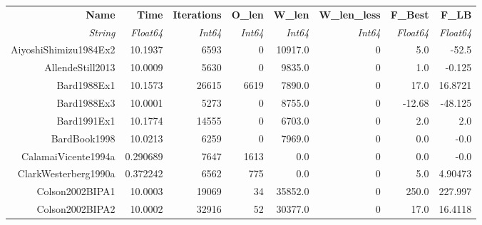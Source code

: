 \begin{tabular}{|r|r|r|r|r|r|r|r|}
  \hline
  \textbf{Name} & \textbf{Time} & \textbf{Iterations} & \textbf{O\_len} & \textbf{W\_len} & \textbf{W\_len\_less} & \textbf{F\_Best} & \textbf{F\_LB} \\
  \textit{String} & \textit{Float64} & \textit{Int64} & \textit{Int64} & \textit{Int64} & \textit{Int64} & \textit{Float64} & \textit{Float64} \\
  \hline
  AiyoshiShimizu1984Ex2 & 10.1937 & 6593 & 0 & 10917.0 & 0 & 5.0 & -52.5 \\
  AllendeStill2013 & 10.0009 & 5630 & 0 & 9835.0 & 0 & 1.0 & -0.125 \\
  Bard1988Ex1 & 10.1573 & 26615 & 6619 & 7890.0 & 0 & 17.0 & 16.8721 \\
  Bard1988Ex3 & 10.0001 & 5273 & 0 & 8755.0 & 0 & -12.68 & -48.125 \\
  Bard1991Ex1 & 10.1774 & 14555 & 0 & 6703.0 & 0 & 2.0 & 2.0 \\
  BardBook1998 & 10.0213 & 6259 & 0 & 7969.0 & 0 & 0.0 & -0.0 \\
  CalamaiVicente1994a & 0.290689 & 7647 & 1613 &   0.0 & 0 & 0.0 & -0.0 \\
  ClarkWesterberg1990a & 0.372242 & 6562 & 775 &   0.0 & 0 & 5.0 & 4.90473 \\
  Colson2002BIPA1 & 10.0003 & 19069 & 34 & 35852.0 & 0 & 250.0 & 227.997 \\
  Colson2002BIPA2 & 10.0002 & 32916 & 52 & 30377.0 & 0 & 17.0 & 16.4118 \\
  \hline
\end{tabular}
